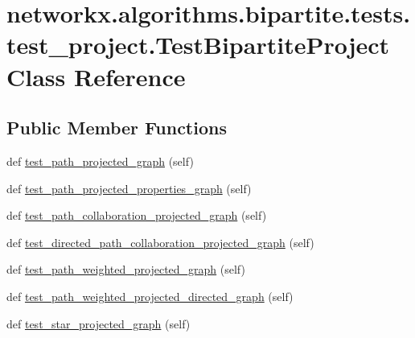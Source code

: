 \hypertarget{classnetworkx_1_1algorithms_1_1bipartite_1_1tests_1_1test__project_1_1TestBipartiteProject}{}\section{networkx.\+algorithms.\+bipartite.\+tests.\+test\+\_\+project.\+Test\+Bipartite\+Project Class Reference}
\label{classnetworkx_1_1algorithms_1_1bipartite_1_1tests_1_1test__project_1_1TestBipartiteProject}
\subsection*{Public Member Functions}
\begin{DoxyCompactItemize}
\item 
def \hyperlink{classnetworkx_1_1algorithms_1_1bipartite_1_1tests_1_1test__project_1_1TestBipartiteProject_aedb414c5dc3d47c0a2f29f6f4153c6e7}{test\+\_\+path\+\_\+projected\+\_\+graph} (self)
\item 
def \hyperlink{classnetworkx_1_1algorithms_1_1bipartite_1_1tests_1_1test__project_1_1TestBipartiteProject_ae225003cbedbaef28957e0cd7bf664e9}{test\+\_\+path\+\_\+projected\+\_\+properties\+\_\+graph} (self)
\item 
def \hyperlink{classnetworkx_1_1algorithms_1_1bipartite_1_1tests_1_1test__project_1_1TestBipartiteProject_a45656af8b218f3baf767d3839b483381}{test\+\_\+path\+\_\+collaboration\+\_\+projected\+\_\+graph} (self)
\item 
def \hyperlink{classnetworkx_1_1algorithms_1_1bipartite_1_1tests_1_1test__project_1_1TestBipartiteProject_a590995c7ccfdc9f8cdd6f156fb29c1fa}{test\+\_\+directed\+\_\+path\+\_\+collaboration\+\_\+projected\+\_\+graph} (self)
\item 
def \hyperlink{classnetworkx_1_1algorithms_1_1bipartite_1_1tests_1_1test__project_1_1TestBipartiteProject_ac32d65ce3e914784da193c34186ce9d6}{test\+\_\+path\+\_\+weighted\+\_\+projected\+\_\+graph} (self)
\item 
def \hyperlink{classnetworkx_1_1algorithms_1_1bipartite_1_1tests_1_1test__project_1_1TestBipartiteProject_ae4e8819609430758a2b3d980ffc2af00}{test\+\_\+path\+\_\+weighted\+\_\+projected\+\_\+directed\+\_\+graph} (self)
\item 
def \hyperlink{classnetworkx_1_1algorithms_1_1bipartite_1_1tests_1_1test__project_1_1TestBipartiteProject_ac15fcd186ae0378087c6534269340109}{test\+\_\+star\+\_\+projected\+\_\+graph} (self)

\end{DoxyCompactItemize}
